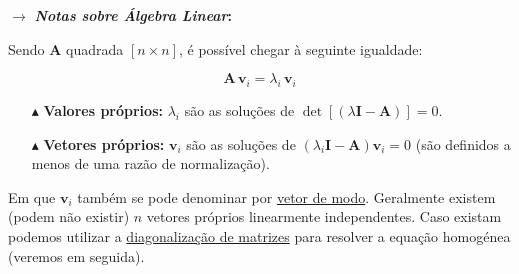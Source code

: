 {

\begin{mdframed}
    \noindent $\pmb{\rightarrow}$ \textbf{\textit{Notas sobre Álgebra Linear}:}
    
    \noindent Sendo $\pmb{A}$ quadrada $[n \times n]$, é possível chegar à seguinte igualdade:
    
    \vspace{0em}
    $$
        \pmb{A}\, \pmb{v}_i = \lambda_i\, \pmb{v}_i
    $$

    \begin{enumerate}
        \item[$\blacktriangle$] \textbf{Valores próprios:} $\lambda_i$ são as soluções de $\det[(\lambda\pmb{I}-\pmb{A})] = 0$.

        \item[$\blacktriangle$] \textbf{Vetores próprios:} $\pmb{v}_i$ são as soluções de $(\lambda_i\pmb{I}-\pmb{A})\pmb{v}_i = 0$ (são definidos a menos de uma razão de normalização).
    \end{enumerate}

    \noindent Em que $\pmb{v}_i$ também se pode denominar por \underline{vetor de modo}. Geralmente existem (podem não existir) $n$ vetores próprios linearmente independentes. Caso existam podemos utilizar a \underline{diagonalização de matrizes} para resolver a equação homogénea (veremos em seguida).
\end{mdframed}
}

\newpage

